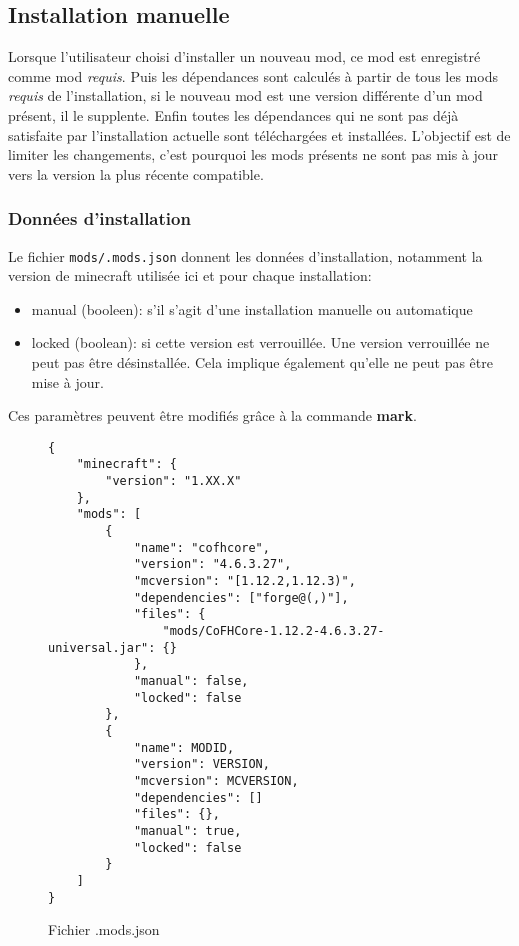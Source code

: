 \documentclass{article}
\begin{document}
\subsection{Installation manuelle}
\label{section:utilisation.manuelle}
Lorsque l'utilisateur choisi d'installer un nouveau mod, ce mod est enregistré comme mod \textit{requis}.
Puis les dépendances sont calculés à partir de tous les mods \textit{requis} de l'installation, si le nouveau mod est une version différente d'un mod présent, il le supplente.
Enfin toutes les dépendances qui ne sont pas déjà satisfaite par l'installation actuelle sont téléchargées et installées.
L'objectif est de limiter les changements, c'est pourquoi les mods présents ne sont pas mis à jour vers la version la plus récente compatible.

\subsubsection{Données d'installation}
Le fichier \texttt{mods/.mods.json} donnent les données d'installation, notamment la version de minecraft utilisée ici et pour chaque installation:
\begin{itemize}
    \item manual (booleen): s'il s'agit d'une installation manuelle ou automatique
    \item locked (boolean): si cette version est verrouillée.
        Une version verrouillée ne peut pas être désinstallée.
        Cela implique également qu'elle ne peut pas être mise à jour.
\end{itemize}

Ces paramètres peuvent être modifiés grâce à la commande \textbf{mark}.

\begin{figure}
\begin{verbatim}
{
    "minecraft": {
        "version": "1.XX.X"
    },
    "mods": [
        {
            "name": "cofhcore",
            "version": "4.6.3.27",
            "mcversion": "[1.12.2,1.12.3)",
            "dependencies": ["forge@(,)"],
            "files": {
                "mods/CoFHCore-1.12.2-4.6.3.27-universal.jar": {}
            },
            "manual": false,
            "locked": false
        },
        {
            "name": MODID,
            "version": VERSION,
            "mcversion": MCVERSION,
            "dependencies": []
            "files": {},
            "manual": true,
            "locked": false
        }
    ]
}
\end{verbatim}
\caption{Fichier .mods.json}
\end{figure}
\end{document}
